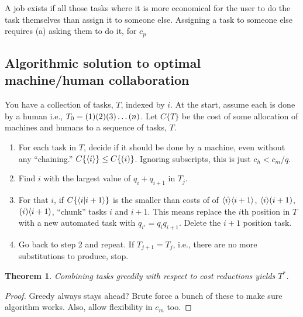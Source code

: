 \documentclass{article}
\newtheorem{theorem}{Theorem}
\begin{document}
A job exists if all those tasks where it is more economical for the user to do the task themselves than assign it to someone else.
Assigning a task to someone else requires (a) asking them to do it, for $c_p$

\subsection{Algorithmic solution to optimal machine/human collaboration}
You have a collection of tasks, $T$, indexed by $i$.
At the start, assume each is done by a human i.e., $T_0 = ( 1 )( 2 )( 3 )\ldots ( n )$.
Let $C\{T\}$ be the cost of some allocation of machines and humans to a sequence of tasks, $T$.
\begin{enumerate}
\item For each task in $T$, decide if it should be done by a machine, even without any ``chaining.'' 
$C\{\langle i \rangle\} \le C\{( i )\}$.
Ignoring subscripts, this is just $c_{h} < c_{m} / q$.
\item Find $i$ with the largest value of $q_i + q_{i + 1}$ in $T_j$.
\item For that $i$, if $C\{\langle i | i + 1 \rangle\}$ is the smaller than costs of of $\langle i \rangle\langle i + 1 \rangle$, $\langle i \rangle( i+1 )$, $( i )\langle i + 1 \rangle$, ``chunk'' tasks $i$ and $i+1$. This means replace the $i$th position in $T$ with a new automated task with $q_{i'} = q_i q_{i+1}$. Delete the $i + 1$ position task.
\item Go back to step 2 and repeat. If $T_{j + 1} = T_{j}$, i.e., there are no more substitutions to produce, stop.
\end{enumerate}

\begin{theorem}
 Combining tasks greedily with respect to cost reductions yields $T^*$.
\end{theorem}
\begin{proof}
 Greedy always stays ahead? Brute force a bunch of these to make sure algorithm works. Also, allow flexibility in $c_m$ too. 
\end{proof}
\end{document}
